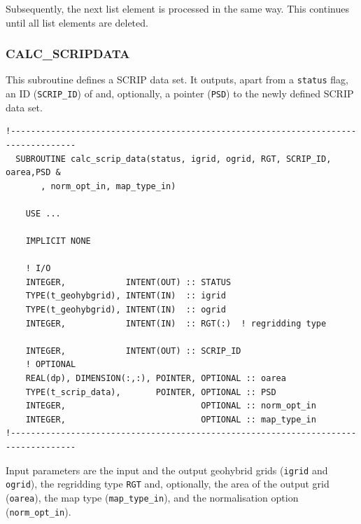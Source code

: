 \documentclass[11pt,twoside]{article}
\begin{document}
Subsequently, the next list element is processed in the same way. This
continues until all list elements are deleted.

\subsubsection{CALC\_SCRIPDATA\label{CALCSD}}
 This subroutine defines a SCRIP data set. It outputs,  apart from 
 a \verb|status| flag, an ID (\verb|SCRIP_ID|) of
 and, optionally, a pointer (\verb|PSD|) to  the newly defined SCRIP data set.
\begin{verbatim}
!-----------------------------------------------------------------------------------
  SUBROUTINE calc_scrip_data(status, igrid, ogrid, RGT, SCRIP_ID, oarea,PSD &
       , norm_opt_in, map_type_in)

    USE ...

    IMPLICIT NONE

    ! I/O
    INTEGER,            INTENT(OUT) :: STATUS
    TYPE(t_geohybgrid), INTENT(IN)  :: igrid
    TYPE(t_geohybgrid), INTENT(IN)  :: ogrid
    INTEGER,            INTENT(IN)  :: RGT(:)  ! regridding type

    INTEGER,            INTENT(OUT) :: SCRIP_ID
    ! OPTIONAL
    REAL(dp), DIMENSION(:,:), POINTER, OPTIONAL :: oarea
    TYPE(t_scrip_data),       POINTER, OPTIONAL :: PSD
    INTEGER,                           OPTIONAL :: norm_opt_in
    INTEGER,                           OPTIONAL :: map_type_in
!-----------------------------------------------------------------------------------
\end{verbatim}
Input parameters are the input and the output geohybrid grids (\verb|igrid|
and \verb|ogrid|), the regridding type \verb|RGT| and, optionally, the
area of the output grid (\verb|oarea|), the map type
(\verb|map_type_in|), and the normalisation option (\verb|norm_opt_in|).
\end{document}
